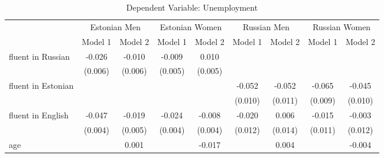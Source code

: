 \label{sec:unemployment_full}
\begin{sidewaystable}
	\caption{Dependent Variable: Unemployment}

\begin{tabular}{l*{2}{c}| *{2}{c}| *{2}{c}| *{2}{c}}
			\toprule
	& \multicolumn{2}{c|}{Estonian Men} & \multicolumn{2}{c|}{Estonian Women} & \multicolumn{2}{c|}{Russian Men} & \multicolumn{2}{c}{Russian Women} \\ 

	
	&\multicolumn{1}{c}{Model 1}&\multicolumn{1}{c|}{Model 2}&\multicolumn{1}{c}{Model 1}&\multicolumn{1}{c|}{Model 2}&\multicolumn{1}{c}{Model 1}&\multicolumn{1}{c|}{Model 2}&\multicolumn{1}{c}{Model 1}&\multicolumn{1}{c}{Model 2}\\
	\midrule
fluent in Russian   &      -0.026\sym{***}&      -0.010         &      -0.009\sym{*}  &       0.010\sym{**} &                     &                     &                     &                     \\
&     (0.006)         &     (0.006)         &     (0.005)         &     (0.005)         &                     &                     &                     &                     \\
fluent in Estonian  &                     &                     &                     &                     &      -0.052\sym{***}&      -0.052\sym{***}&      -0.065\sym{***}&      -0.045\sym{***}\\
&                     &                     &                     &                     &     (0.010)         &     (0.011)         &     (0.009)         &     (0.010)         \\
fluent in English   &      -0.047\sym{***}&      -0.019\sym{***}&      -0.024\sym{***}&      -0.008\sym{*}  &      -0.020         &       0.006         &      -0.015         &      -0.003         \\
&     (0.004)         &     (0.005)         &     (0.004)         &     (0.004)         &     (0.012)         &     (0.014)         &     (0.011)         &     (0.012)         \\
age                 &                     &       0.001         &                     &      -0.017\sym{***}&                     &       0.004         &                     &      -0.004         \\

\end{tabular}
\end{sidewaystable}
